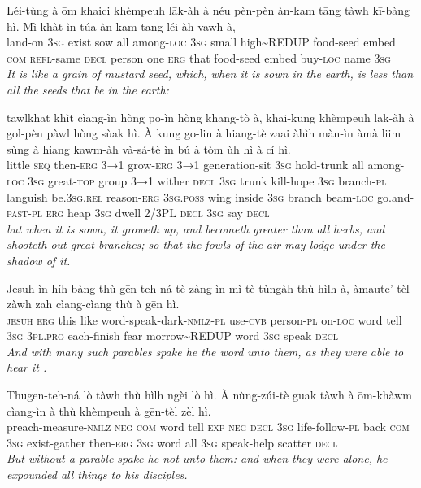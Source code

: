 \documentclass[11pt,a4paper]{article}
\begin{document}
\begin{exe}
\gll Léi-tùng à ōm khaici khèmpeuh lāk-àh à néu pèn-pèn àn-kam tāng tàwh kī-bàng hì. Mì khàt ìn túa àn-kam tāng léi-àh vawh à, \\
     land-on \textsc{3sg} exist sow all among-\textsc{loc} \textsc{3sg} small high\textasciitilde{}REDUP food-seed embed \textsc{com} \textsc{refl}-same \textsc{decl} person one \textsc{erg} that food-seed embed buy-\textsc{loc} name \textsc{3sg} \\
\glt \textcolor{kjvcolor}{\textit{It is like a grain of mustard seed, which, when it is sown in the earth, is less than all the seeds that be in the earth:}}

\gll tawlkhat khìt cìang-ìn hòng po-ìn hòng khang-tò à, khai-kung khèmpeuh lāk-àh à gol-pèn pàwl hòng sùak hì. À kung go-lin à hiang-tè zaai àhìh màn-ìn àmà liim sùng à hiang kawm-àh và-sá-tè ìn bú à tòm ùh hì à cí hì. \\
     little \textsc{seq} then-\textsc{erg} \textsc{3→1} grow-\textsc{erg} \textsc{3→1} generation-sit \textsc{3sg} hold-trunk all among-\textsc{loc} \textsc{3sg} great-\textsc{top} group \textsc{3→1} wither \textsc{decl} \textsc{3sg} trunk kill-hope \textsc{3sg} branch-\textsc{pl} languish be.\textsc{3sg}.\textsc{rel} reason-\textsc{erg} \textsc{3sg}.\textsc{poss} wing inside \textsc{3sg} branch beam-\textsc{loc} go.and-\textsc{past}-\textsc{pl} \textsc{erg} heap \textsc{3sg} dwell 2/3PL \textsc{decl} \textsc{3sg} say \textsc{decl} \\
\glt \textcolor{kjvcolor}{\textit{but when it is sown, it groweth up, and becometh greater than all herbs, and shooteth out great branches; so that the fowls of the air may lodge under the shadow of it.}}

\gll Jesuh ìn híh bàng thù-gēn-teh-ná-tè zàng-ìn mì-tè tùngàh thù hìlh à, àmaute' tèl-zàwh zah cìang-cìang thù à gēn hì. \\
     \textsc{jesuh} \textsc{erg} this like word-speak-dark-\textsc{nmlz}-\textsc{pl} use-\textsc{cvb} person-\textsc{pl} on-\textsc{loc} word tell \textsc{3sg} \textsc{3pl}.\textsc{pro} each-finish fear morrow\textasciitilde{}REDUP word \textsc{3sg} speak \textsc{decl} \\
\glt \textcolor{kjvcolor}{\textit{And with many such parables spake he the word unto them, as they were able to hear it .}}

\gll Thugen-teh-ná lò tàwh thù hìlh ngèi lò hì. À nùng-zúi-tè guak tàwh à ōm-khàwm cìang-ìn à thù khèmpeuh à gēn-tèl zèl hì. \\
     preach-measure-\textsc{nmlz} \textsc{neg} \textsc{com} word tell \textsc{exp} \textsc{neg} \textsc{decl} \textsc{3sg} life-follow-\textsc{pl} back \textsc{com} \textsc{3sg} exist-gather then-\textsc{erg} \textsc{3sg} word all \textsc{3sg} speak-help scatter \textsc{decl} \\
\glt \textcolor{kjvcolor}{\textit{But without a parable spake he not unto them: and when they were alone, he expounded all things to his disciples.}}


\end{exe}
\end{document}
